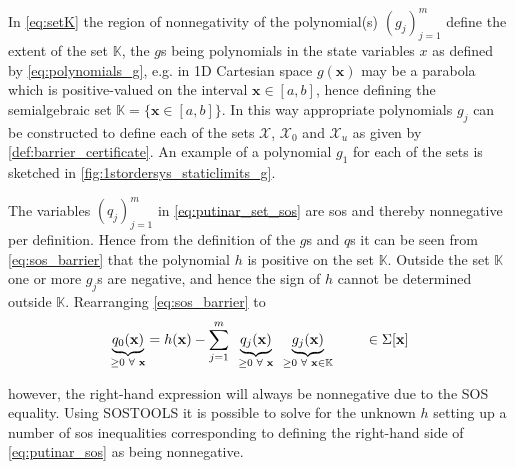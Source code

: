 In \autoref{eq:setK} the region of nonnegativity of the polynomial(s) $(g_j)_{j=1}^m$ define the extent of the set $\mathbb{K}$, the $g$s being  polynomials in the state variables $x$ as defined by \autoref{eq:polynomials_g}, e.g. in 1D Cartesian space $g(\mathbf{x})$ may be a parabola which is positive-valued on the interval $\mathbf{x}\in[a,b]$, hence defining the semialgebraic set $\mathbb{K}=\{\mathbf{x}\in[a,b]\}$. In this way appropriate polynomials $g_j$ can be constructed  to define each of the sets $\mathcal{X}$, $\mathcal{X}_0$ and $\mathcal{X}_u$ as given by \autoref{def:barrier_certificate}. An example of a polynomial $g_1$ for each of the sets is sketched in \autoref{fig:1stordersys_staticlimits_g}.

The variables $(q_j)_{j=1}^m$ in \autoref{eq:putinar_set_sos} are \gls{sos} and thereby nonnegative per definition. Hence from the definition of the $g$s and $q$s it can be seen from \autoref{eq:sos_barrier} that the polynomial $h$ is positive on the set $\mathbb{K}$.
Outside the set $\mathbb{K}$ one or more $g_j$s are negative, and hence the sign of $h$ cannot be determined outside $\mathbb{K}$.
Rearranging \autoref{eq:sos_barrier} to
\vspace{-2mm}
\begin{equation}
\underbrace{q_0(\mathbf{x})}_{\geq 0\,\,\forall \,\,\mathbf{x}} = h(\mathbf{x}) - \sum _{j=1}^{m}\,\,\,\underbrace{q_j(\mathbf{x})}_{\geq 0\,\,\forall \,\,\mathbf{x}}\,\,\,\underbrace{g_j(\mathbf{x})}_{\geq 0 \,\,\forall \,\,\mathbf{x}\in\mathbb{K}} \hspace{0.8cm} \in\Sigma[\mathbf{x}]\label{eq:putinar_sos}
\end{equation} 

\vspace{-1mm}
however, the right-hand expression will always be nonnegative due to the SOS equality. Using SOSTOOLS  it is possible to solve for the unknown $h$ setting up a number of \gls{sos} inequalities corresponding to defining the right-hand side of \autoref{eq:putinar_sos} as being nonnegative. %

